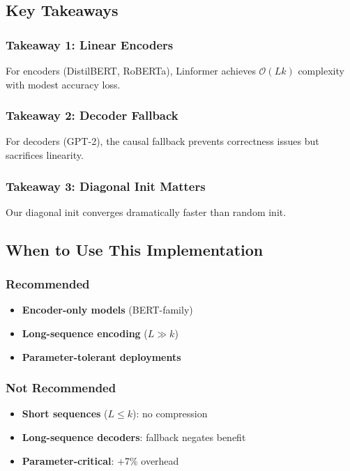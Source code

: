 \subsection{Key Takeaways}

\subsubsection{Takeaway 1: Linear Encoders}

For encoders (DistilBERT, RoBERTa), Linformer achieves $\mathcal{O}(L k)$ 
complexity with modest accuracy loss.

\subsubsection{Takeaway 2: Decoder Fallback}

For decoders (GPT-2), the causal fallback prevents correctness issues but 
sacrifices linearity.

\subsubsection{Takeaway 3: Diagonal Init Matters}

Our diagonal init converges dramatically faster than random init.

\subsection{When to Use This Implementation}

\subsubsection{Recommended}
\begin{itemize}
\item \textbf{Encoder-only models} (BERT-family)
\item \textbf{Long-sequence encoding} ($L \gg k$)
\item \textbf{Parameter-tolerant deployments}

\end{itemize}
\subsubsection{Not Recommended}
\begin{itemize}
\item \textbf{Short sequences} ($L \leq k$): no compression
\item \textbf{Long-sequence decoders}: fallback negates benefit
\item \textbf{Parameter-critical}: +7\% overhead

\end{itemize}
